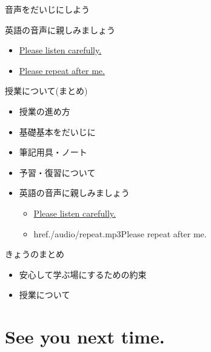 \documentclass[
  ignorenonframetext,
  aspectratio=169,
  xcolor=dvipsnames]{beamer}
\providecommand{\tightlist}{%
  \setlength{\itemsep}{0pt}\setlength{\parskip}{0pt}}
\begin{document}
\begin{frame}{音声をだいじにしよう}
\label{ux97f3ux58f0ux3092ux3060ux3044ux3058ux306bux3057ux3088ux3046}
\LARGE

英語の音声に親しみましょう

\begin{itemize}[<+->]
\tightlist
\item
  \href{./audio/listen.mp3}{Please listen carefully.}
\item
  \href{./audio/repeat.mp3}{Please repeat after me.}
\end{itemize}
\end{frame}

\begin{frame}{授業について(まとめ)}
\label{ux6388ux696dux306bux3064ux3044ux3066ux307eux3068ux3081}
\Large

\begin{itemize}
\item 授業の進め方
\item 基礎基本をだいじに
\item 筆記用具・ノート
\item 予習・復習について
\item 英語の音声に親しみましょう
      \begin{itemize}
         \item  \href{./audio/listen.mp3}{Please listen carefully.}
         \item  href{./audio/repeat.mp3}{Please repeat after me.}
      \end{itemize}
\end{itemize}
\end{frame}

\begin{frame}{きょうのまとめ}
\label{ux304dux3087ux3046ux306eux307eux3068ux3081}
\LARGE

\begin{itemize}
\item  安心して学ぶ場にするための約束
\item  授業について
\end{itemize}
\end{frame}

\section{See you next time.}\label{see-you-next-time.}

\begin{frame}{}
\label{section-3}
\end{frame}
\end{document}
